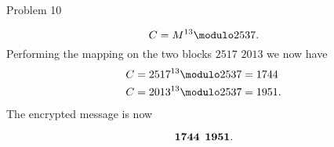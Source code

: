 \begin{problem}{Problem 10}
\begin{Highlight}[Solution]
        \begin{equation}
            C = M^{13} \modulo 2537.
        \end{equation}
        Performing the mapping on the two blocks $\text{2517 2013}$ we now have
        \begin{align}
            C & = 2517^{13} \modulo 2537 = 1744 \\
            C & = 2013^{13} \modulo 2537 = 1951.
        \end{align}
        The encrypted message is now

        \begin{equation}
            \mathbf{1744} \hspace*{5pt} \mathbf{1951}.
        \end{equation}
    \end{Highlight}
\end{problem}

